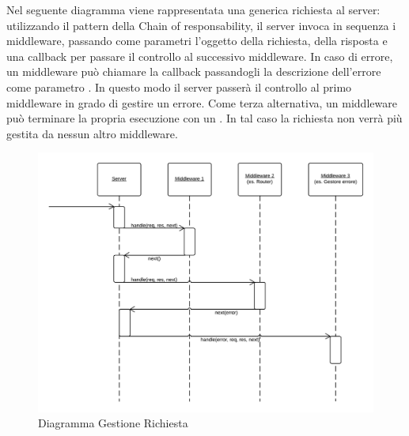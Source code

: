 Nel seguente diagramma viene rappresentata una generica richiesta al server: utilizzando il pattern della Chain of responsability, il server invoca in sequenza i middleware, passando come parametri l'oggetto della richiesta, della risposta e una callback per passare il controllo al successivo middleware. In caso di errore, un middleware può chiamare la callback passandogli la descrizione dell'errore come parametro . In questo modo il server passerà il controllo al primo middleware in grado di gestire un errore. Come terza alternativa, un middleware può terminare la propria esecuzione con un . In tal caso la richiesta non verrà più gestita da nessun altro middleware.

\begin{figure}[H]
	\begin{center} 
		\includegraphics[scale=0.27]{scenari/Diagramma Gestione Richiesta.png}  
		\caption{Diagramma Gestione Richiesta}
	\end{center}  
\end{figure} 

